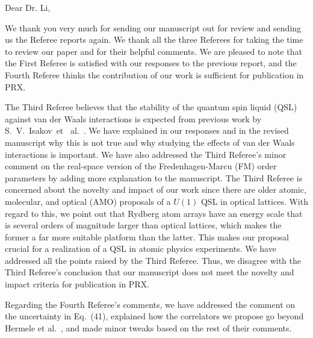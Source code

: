 \documentclass[
onecolumn,
superscriptaddress,
longbibliography,
nofootinbib,
 amsmath,amssymb,
 aps,
prb
]{revtex4-2}
\begin{document}





Dear Dr. Li,

We thank you very much for sending our manuscript out for review and sending us the Referee reports again. We thank all the three Referees for taking the time to review our paper and for their helpful comments. We are pleased to note that the First Referee is satisfied with our responses to the previous report, and the Fourth Referee thinks the contribution of our work is sufficient for publication in PRX.


The Third Referee believes that the stability of the quantum spin liquid (QSL) against van der Waals interactions is expected from previous work by S.~V.~Isakov~et ~al.~\cite{isakov2005why}. We have explained in our responses and in the revised manuscript why this is not true and why studying the effects of van der Waals interactions is important. We have also addressed the Third Referee's minor comment on the real-space version of the Fredenhagen-Marcu (FM) order parameters by adding more explanation to the manuscript. 
The Third Referee is concerned about the novelty and impact of our work since there are older atomic, molecular, and optical (AMO) proposals of a $U(1)$ QSL in optical lattices. 
With regard to this, we point out that Rydberg atom arrays have an energy scale that is several orders of magnitude larger than optical lattices, which makes the former a far more suitable platform than the latter.
This makes our proposal crucial for a realization of a QSL in atomic physics experiments.
We have addressed all the points raised by the Third Referee. Thus, we disagree with the Third Referee's conclusion that our manuscript does not meet the novelty and impact criteria for publication in PRX.

Regarding the Fourth Referee's comments, we have addressed the comment on the uncertainty in Eq.~(41), explained how the correlators we propose go beyond Hermele et al.~\cite{hermele2004}, and made minor tweaks based on the rest of their comments.
\end{document}
